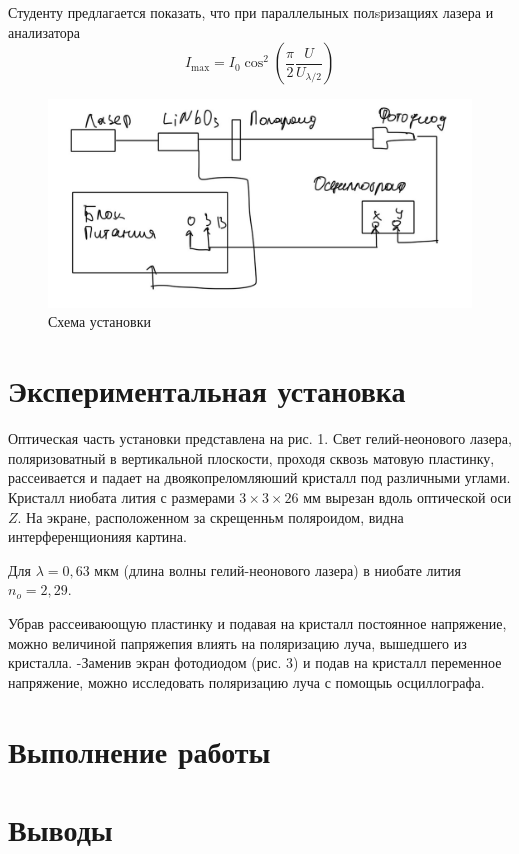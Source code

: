 \documentclass[a4paper, 12pt]{article}
\begin{document}
Студенту предлагается показать, что при параллелыных полsризащиях лазера и анализатора
\begin{equation}
I_{\mathrm{max}}=I_0 \cos ^2\left(\frac{\pi}{2} \frac{U}{U_{\lambda / 2}}\right)
\end{equation}

\begin{figure}[H]
    \centering
    \includegraphics[width=1\textwidth]{ris3}
    \caption{Схема установки}
    \label{fig:ris3}
\end{figure}

\section{Экспериментальная установка}
Оптическая часть установки представлена на рис. 1. Свет гелий-неонового лазера, поляризоватный в вертикальной плоскости, проходя сквозь матовую пластинку, рассеивается и падает на двоякопреломляюший кристалл под различными углами. Кристалл ниобата лития с размерами $3 \times 3 \times 26$ мм вырезан вдоль оптической оси $Z$. На экране, расположенном за скрещенньм поляроидом, видна интерференщионияя картина.

Для $\lambda=0,63$ мкм (длина волны гелий-неонового лазера) в ниобате лития $n_o=2,29$.

Убрав рассеиваюощую пластинку и подавая на кристалл постоянное напряжение, можно величиной папряжепия влиять на поляризацию луча, вышедшего из кристалла.
-Заменив экран фотодиодом (рис. 3) и подав на кристалл переменное напряжение, можно исследовать поляризацию луча с помощыь осциллографа.
\section{Выполнение работы}

\section{Выводы}
\end{document}
